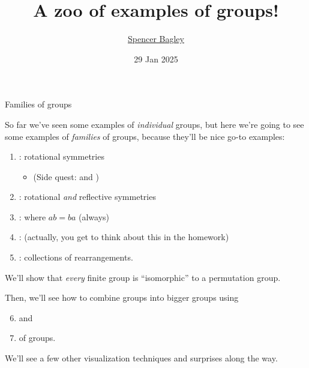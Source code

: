 \documentclass[8pt,handout]{beamer}
\newcommand{\Pause}{}      %
\begin{document}

\title[A zoo of examples of groups!]{A zoo of examples of groups!}

\author[\href{mailto:sbagley@westminsteru.edu}{S. Bagley}]
       {\href{mailto:sbagley@westminsteru.edu}{Spencer Bagley}}


\date[29 Jan 2025]{29 Jan 2025}

\frame{\titlepage}


\begin{frame}{Families of groups} %

  So far we've seen some examples of \textit{individual} groups, but here we're going to see some examples of \textit{families} of groups, because they'll be nice go-to examples:

  \begin{enumerate}
  \item \textbf{}: rotational symmetries
  \begin{itemize}
    \item (Side quest:  and ) \Pause
  \end{itemize}
  \item \textbf{}: rotational \emph{and}
    reflective symmetries \Pause
  \item \textbf{}: where $ab=ba$ (always) \Pause
  \item \textbf{}: (actually, you get to think about this in the homework) \Pause
  \item \textbf{}: collections of
    rearrangements. \Pause
  \end{enumerate}

  We'll show that \emph{every} finite group is ``isomorphic'' to a
  permutation group. \medskip\Pause

  Then, we'll see how to combine groups into bigger groups using
  
  \begin{enumerate}
    \setcounter{enumi}{5}
  \item \textbf{} and 
  \item \textbf{} of groups.  \Pause
  \end{enumerate}

  We'll see a few other visualization techniques and surprises along
  the way.
  
  
\end{frame}
\end{document}

